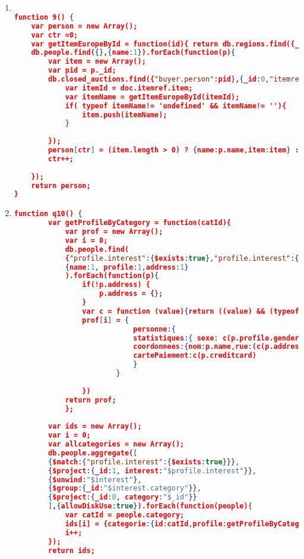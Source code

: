 \begin{enumerate}[label=Q\arabic*]
\begin{lstlisting}[language=JSON,   basicstyle=\scriptsize]
		item[ct] = {person:people.name,count:count};
		ct++;
	});
	
	return item;
 }
        
	\end{lstlisting}
	
    \item \label{mongodb-q-9}%
	\begin{lstlisting}[language=JSON,   basicstyle=\scriptsize]
	
function 9() {
    var person = new Array();
	var ctr =0;
	var getItemEuropeById = function(id){ return db.regions.find({_id:id, regions:"europe"},{_id:0,name:1}).name;};
	db.people.find({},{name:1}).forEach(function(p){
		var item = new Array();
		var pid = p._id;
		db.closed_auctions.find({"buyer.person":pid},{_id:0,"itemref.item":1}).forEach(function(doc){
			var itemId = doc.itemref.item;
			var itemName = getItemEuropeById(itemId);
			if( typeof itemName!= 'undefined' && itemName!= ''){
				item.push(itemName);
			}
			
		});
		person[ctr] = (item.length > 0) ? {name:p.name,item:item} : {name:p.name}; 
		ctr++;
		
	});	
	return person;
}

	\end{lstlisting}
	
	
    \item \label{mongodb-q-10}%
	\begin{lstlisting}[language=JSON,   basicstyle=\scriptsize]
	function q10() {
	    var getProfileByCategory = function(catId){
    		var prof = new Array();
    		var i = 0;
    		db.people.find(
    		{"profile.interest":{$exists:true},"profile.interest":{"$elemMatch": {category:catId}}},
    		{name:1, profile:1,address:1}
    		).forEach(function(p){
    			if(!p.address) {
    				p.address = {};
    			}
    			var c = function (value){return ((value) && (typeof value !== "undefined")) ? value : "";}; 
    			prof[i] = {
    						personne:{
    						statistiques:{ sexe: c(p.profile.gender), age:c(p.profile.gender),education:c(p.profile.education),revenu:c(p.profile.income)},
    						coordonnees:{nom:p.name,rue:(c(p.address) && c(p.address.street)),ville:c(p.address.city),pays:c(p.address.country),reseau:{courrier:c(p.emailaddress), pagePerso:c(p.homepage)}},
    						cartePaiement:c(p.creditcard)
    						} 
    					}
    			
    			})
    		return prof;
    		};
        
        var ids = new Array();
    	var i = 0;
    	var allcategories = new Array();
    	db.people.aggregate([
    	{$match:{"profile.interest":{$exists:true}}},
    	{$project:{_id:1, interest:"$profile.interest"}},
    	{$unwind:"$interest"},
    	{$group:{_id:"$interest.category"}},
    	{$project:{_id:0, category:"$_id"}}
    	],{allowDiskUse:true}).forEach(function(people){
    		var catId = people.category;
    		ids[i] = {categorie:{id:catId,profile:getProfileByCategory(catId)}}
    		i++;
    	});
    	return ids;
    

\end{lstlisting}
\end{enumerate}
